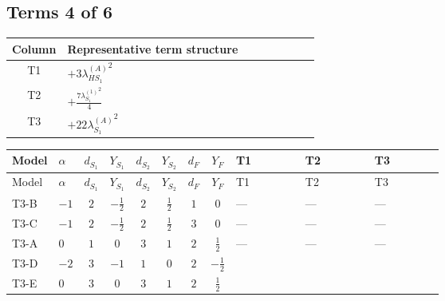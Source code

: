 \documentclass[8pt]{article}
\begin{document}
\begin{landscape}
\subsection*{Terms 4 of 6}
\begin{center}
\begin{tabular}{@{}c >{\raggedright\arraybackslash}p{0.82\linewidth}@{}}
\toprule
Column & Representative term structure \\
\midrule
T1 & \(\displaystyle +3 {\lambda_{HS_1}^{(A)}}^2\) \\
\midrule
T2 & \(\displaystyle +\frac{7 {\lambda_{S_1}^{(1)}}^2}{4}\) \\
\midrule
T3 & \(\displaystyle +22 {\lambda_{S_1}^{(A)}}^2\) \\
\midrule
\bottomrule
\end{tabular}
\end{center}
\smallskip
\tiny
\begin{longtable}{@{}llcccccc >{\raggedright\arraybackslash}p{0.21\linewidth} >{\raggedright\arraybackslash}p{0.21\linewidth} >{\raggedright\arraybackslash}p{0.21\linewidth}@{}}
\toprule
Model & $\alpha$ & $d_{S_1}$ & $Y_{S_1}$ & $d_{S_2}$ & $Y_{S_2}$ & $d_F$ & $Y_F$ & T1 & T2 & T3 \\
\midrule
\endfirsthead
\toprule
Model & $\alpha$ & $d_{S_1}$ & $Y_{S_1}$ & $d_{S_2}$ & $Y_{S_2}$ & $d_F$ & $Y_F$ & T1 & T2 & T3 \\
\midrule
\endhead
T3-B & $-1$ & $2$ & $-\frac{1}{2}$ & $2$ & $\frac{1}{2}$ & $1$ & $0$ & --- & --- & --- \\
\midrule
T3-C & $-1$ & $2$ & $-\frac{1}{2}$ & $2$ & $\frac{1}{2}$ & $3$ & $0$ & --- & --- & --- \\
\midrule
T3-A & $0$ & $1$ & $0$ & $3$ & $1$ & $2$ & $\frac{1}{2}$ & --- & --- & --- \\
\midrule
T3-D & $-2$ & $3$ & $-1$ & $1$ & $0$ & $2$ & $-\frac{1}{2}$ & \scriptsize\adjustbox{max width=\linewidth}{$\begin{gathered} +3 {\lambda_{HS_1}^{(A)}}^2\end{gathered}$} & \scriptsize\adjustbox{max width=\linewidth}{$\begin{gathered} +\frac{7 {\lambda_{S_1}^{(1)}}^2}{4}\end{gathered}$} & \scriptsize\adjustbox{max width=\linewidth}{$\begin{gathered} +22 {\lambda_{S_1}^{(A)}}^2\end{gathered}$} \\
\midrule
T3-E & $0$ & $3$ & $0$ & $3$ & $1$ & $2$ & $\frac{1}{2}$ & \scriptsize\adjustbox{max width=\linewidth}{$\begin{gathered} +3 {\lambda_{HS_1}^{(A)}}^2\end{gathered}$} & \scriptsize\adjustbox{max width=\linewidth}{$\begin{gathered} +\frac{7 {\lambda_{S_1}^{(1)}}^2}{4}\end{gathered}$} & \scriptsize\adjustbox{max width=\linewidth}{$\begin{gathered} +22 {\lambda_{S_1}^{(A)}}^2\end{gathered}$} \\

\end{longtable}
\end{landscape}
\end{document}
